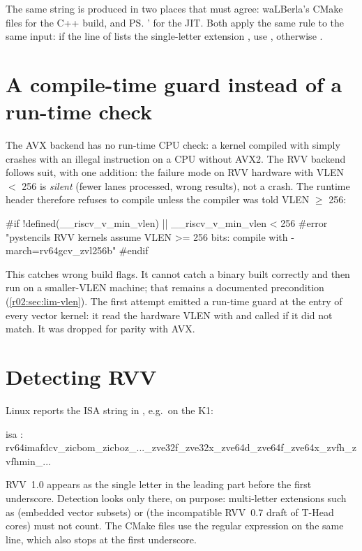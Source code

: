 The same string is produced in two places that must agree: waLBerla's CMake files for
the C++ build, and \ps{}'  for the JIT. Both apply the same rule to
the same input: if the  line of  lists the single-letter
extension , use , otherwise .

\section{A compile-time guard instead of a run-time check}\label{r02:sec:design-guard}

The AVX backend has no run-time CPU check: a kernel compiled with
 simply crashes with an illegal instruction on a CPU without
AVX2. The RVV backend follows suit, with one addition: the failure mode on RVV hardware
with VLEN $<$ 256 is \emph{silent} (fewer lanes processed, wrong results), not a crash.
The runtime header therefore refuses to compile unless the compiler was told
VLEN $\geq$ 256:
\begin{ccode}
#if !defined(__riscv_v_min_vlen) || __riscv_v_min_vlen < 256
#error "pystencils RVV kernels assume VLEN >= 256 bits: compile with -march=rv64gcv_zvl256b"
#endif
\end{ccode}
This catches wrong build flags. It cannot catch a binary built correctly and then run on
a smaller-VLEN machine; that remains a documented precondition (\cref{r02:sec:lim-vlen}).
The first attempt emitted a run-time guard at the entry of every vector kernel: it read
the hardware VLEN with  and called  if it did
not match. It was dropped for parity with AVX.

\section{Detecting RVV}\label{r02:sec:design-detect}

Linux reports the ISA string in , e.g.\ on the K1:
\begin{plaincode}
isa : rv64imafdcv_zicbom_zicboz_..._zve32f_zve32x_zve64d_zve64f_zve64x_zvfh_zvfhmin_...
\end{plaincode}
RVV~1.0 appears as the single letter  in the leading part before the first
underscore. Detection looks only there, on purpose: multi-letter extensions such as
 (embedded vector subsets) or  (the incompatible RVV~0.7
draft of T-Head cores) must not count. The CMake files use the regular expression
 on the same line, which also stops at the first underscore.

